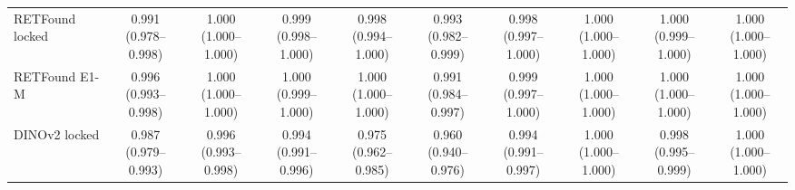 \begin{tabular}{@{}lccccccccc@{}}
RETFound locked & \makecell{0.991\\{\scriptsize (0.978--0.998)}} & \makecell{1.000\\{\scriptsize (1.000--1.000)}} & \makecell{0.999\\{\scriptsize (0.998--1.000)}} & \makecell{0.998\\{\scriptsize (0.994--1.000)}} & \makecell{0.993\\{\scriptsize (0.982--0.999)}} & \makecell{0.998\\{\scriptsize (0.997--1.000)}} & \makecell{1.000\\{\scriptsize (1.000--1.000)}} & \makecell{1.000\\{\scriptsize (0.999--1.000)}} & \makecell{1.000\\{\scriptsize (1.000--1.000)}} \\
RETFound E1-M & \makecell{0.996\\{\scriptsize (0.993--0.998)}} & \makecell{1.000\\{\scriptsize (1.000--1.000)}} & \makecell{1.000\\{\scriptsize (0.999--1.000)}} & \makecell{1.000\\{\scriptsize (1.000--1.000)}} & \makecell{0.991\\{\scriptsize (0.984--0.997)}} & \makecell{0.999\\{\scriptsize (0.997--1.000)}} & \makecell{1.000\\{\scriptsize (1.000--1.000)}} & \makecell{1.000\\{\scriptsize (1.000--1.000)}} & \makecell{1.000\\{\scriptsize (1.000--1.000)}} \\
DINOv2 locked & \makecell{0.987\\{\scriptsize (0.979--0.993)}} & \makecell{0.996\\{\scriptsize (0.993--0.998)}} & \makecell{0.994\\{\scriptsize (0.991--0.996)}} & \makecell{0.975\\{\scriptsize (0.962--0.985)}} & \makecell{0.960\\{\scriptsize (0.940--0.976)}} & \makecell{0.994\\{\scriptsize (0.991--0.997)}} & \makecell{1.000\\{\scriptsize (1.000--1.000)}} & \makecell{0.998\\{\scriptsize (0.995--0.999)}} & \makecell{1.000\\{\scriptsize (1.000--1.000)}} \\

\end{tabular}
